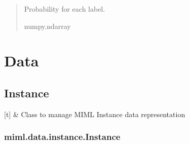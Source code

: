 \documentclass[letterpaper,10pt,english]{sphinxmanual}
\begin{document}
\begin{fulllineitems}
\begin{fulllineitems}
\begin{quote}
\begin{description}
\sphinxAtStartPar
Probability for each label.

\sphinxAtStartPar
numpy.ndarray

\end{description}\end{quote}

\end{fulllineitems}


\end{fulllineitems}


\sphinxstepscope


\chapter{Data}
\label{\detokenize{data/index:data}}\label{\detokenize{data/index::doc}}
\sphinxstepscope


\section{Instance}
\label{\detokenize{data/instance:instance}}\label{\detokenize{data/instance::doc}}

\begin{savenotes}\sphinxattablestart
\sphinxthistablewithglobalstyle
\sphinxthistablewithnovlinesstyle
\centering
\begin{tabulary}{\linewidth}[t]{}
\sphinxtoprule
\sphinxtableatstartofbodyhook
\sphinxAtStartPar
{\hyperref[\detokenize{data/_autosummary/miml.data.instance.Instance:miml.data.instance.Instance}]{}}
&
\sphinxAtStartPar
Class to manage MIML Instance data representation
\\
\sphinxbottomrule
\end{tabulary}
\sphinxtableafterendhook\par
\sphinxattableend\end{savenotes}

\sphinxstepscope


\subsection{miml.data.instance.Instance}
\label{\detokenize{data/_autosummary/miml.data.instance.Instance:miml-data-instance-instance}}\label{\detokenize{data/_autosummary/miml.data.instance.Instance::doc}}
\end{document}
